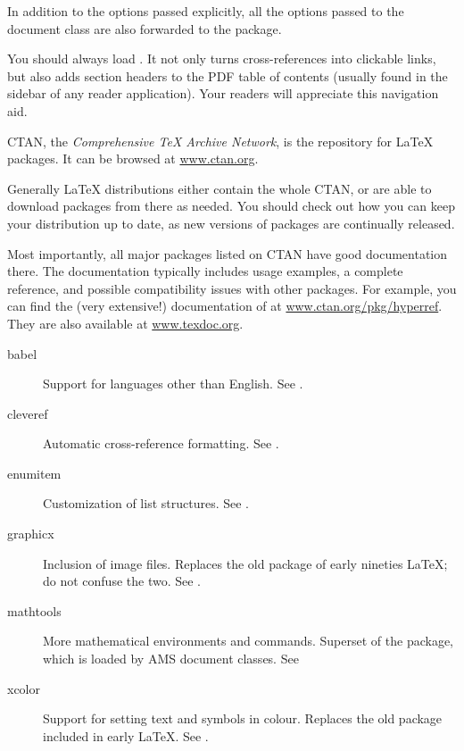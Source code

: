 In addition to the options passed explicitly,
all the options passed to the document class are also forwarded to the package.

\begin{practices}
You should always load .
It not only turns cross-references into clickable links,
but also adds section headers to the PDF table of contents
(usually found in the sidebar of any reader application).
Your readers will appreciate this navigation aid.
\end{practices}

CTAN, the \emph{Comprehensive \TeX{} Archive Network},
is the repository for \LaTeX{} packages.
It can be browsed at \url{www.ctan.org}.

Generally \LaTeX{} distributions either contain the whole CTAN,
or are able to download packages from there as needed.
You should check out how you can keep your distribution up to date,
as new versions of packages are continually released.

Most importantly, all major packages listed on CTAN have good documentation there.
The documentation typically includes usage examples, a complete reference,
and possible compatibility issues with other packages.
For example, you can find the (very extensive!) documentation of 
at \url{www.ctan.org/pkg/hyperref}.
They are also available at \url{www.texdoc.org}.

\begin{description}
\item[babel] Support for languages other than English.
    See .
\item[cleveref] Automatic cross-reference formatting.
    See .
\item[enumitem] Customization of list structures.
    See .
\item[graphicx] Inclusion of image files.
    Replaces the old  package of early nineties \LaTeX{};
    do not confuse the two.
    See .
\item[mathtools] More mathematical environments and commands.
    Superset of the  package, which is loaded by AMS document classes.
    See 
\item[xcolor] Support for setting text and symbols in colour.
    Replaces the old  package included in early \LaTeX{}.
    See .
\end{description}


